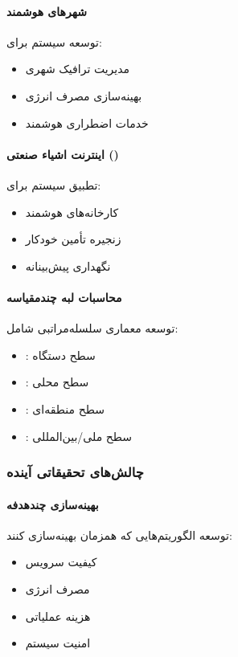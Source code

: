 \documentclass[11pt]{article}
\begin{document}
\paragraph{شهرهای هوشمند}
توسعه سیستم برای:
\begin{itemize}
\item مدیریت ترافیک شهری
\item بهینه‌سازی مصرف انرژی
\item خدمات اضطراری هوشمند
\end{itemize}

\paragraph{اینترنت اشیاء صنعتی ()}
تطبیق سیستم برای:
\begin{itemize}
\item کارخانه‌های هوشمند
\item زنجیره تأمین خودکار
\item نگهداری پیش‌بینانه
\end{itemize}

\paragraph{محاسبات لبه چندمقیاسه}
توسعه معماری سلسله‌مراتبی شامل:
\begin{itemize}
\item {}: سطح دستگاه
\item {}: سطح محلی
\item {}: سطح منطقه‌ای
\item {}: سطح ملی/بین‌المللی
\end{itemize}

\subsubsection{چالش‌های تحقیقاتی آینده}

\paragraph{بهینه‌سازی چندهدفه}
توسعه الگوریتم‌هایی که همزمان بهینه‌سازی کنند:
\begin{itemize}
\item کیفیت سرویس
\item مصرف انرژی
\item هزینه عملیاتی
\item امنیت سیستم
\end{itemize}
\end{document}
